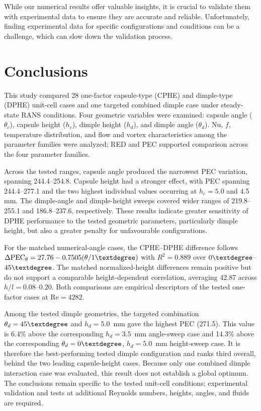 \documentclass[energies,article,submit,moreauthors,noheaderline]{Definitions/mdpi}
\newcommand{\degree}{\texorpdfstring{\ensuremath{^\circ}}{\textdegree}}
\def\ensuremath#1{}%
\def\degree{\textdegree}%
\begin{document}
While our numerical results offer valuable insights, it is crucial to validate them with experimental data to ensure they are accurate and reliable. Unfortunately, finding experimental data for specific configurations and conditions can be a challenge, which can slow down the validation process.


\section{Conclusions}
\label{sec:conclusion}

This study compared 28 one-factor capsule-type (CPHE) and dimple-type (DPHE) unit-cell cases and one targeted combined dimple case under steady-state RANS conditions. Four geometric variables were examined: capsule angle ($\theta_c$), capsule height ($h_c$), dimple height ($h_d$), and dimple angle ($\theta_d$). Nu, $f$, temperature distribution, and flow and vortex characteristics among the parameter families were analyzed; RED and PEC supported comparison across the four parameter families.

Across the tested ranges, capsule angle produced the narrowest PEC variation, spanning 244.4–254.8. Capsule height had a stronger effect, with PEC spanning 244.4–277.1 and the two highest individual values occurring at \(h_c=5.0\) and 4.5 mm. The dimple-angle and dimple-height sweeps covered wider ranges of 219.8–255.1 and 186.8–237.6, respectively. These results indicate greater sensitivity of DPHE performance to the tested geometric parameters, particularly dimple height, but also a greater penalty for unfavourable configurations.

For the matched numerical-angle cases, the CPHE--DPHE difference follows $\Delta\mathrm{PEC}_{\theta}=27.76-0.7505(\theta/1\degree)$ with $R^2=0.889$ over $0\degree$--$45\degree$. The matched normalized-height differences remain positive but do not support a comparable height-dependent correlation, averaging 42.87 across $h/l=0.08$--$0.20$. Both comparisons are empirical descriptors of the tested one-factor cases at $\mathrm{Re}=4282$.

Among the tested dimple geometries, the targeted combination $\theta_d=45\degree$ and $h_d=5.0$~mm gave the highest PEC (271.5). This value is 6.4\% above the corresponding $h_d=3.5$~mm angle-sweep case and 14.3\% above the corresponding $\theta_d=0\degree$, $h_d=5.0$~mm height-sweep case. It is therefore the best-performing tested dimple configuration and ranks third overall, behind the two leading capsule-height cases. Because only one combined dimple interaction case was evaluated, this result does not establish a global optimum. The conclusions remain specific to the tested unit-cell conditions; experimental validation and tests at additional Reynolds numbers, heights, angles, and fluids are required.
\end{document}
